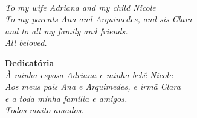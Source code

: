 \documentclass[
	12pt,				%
	openright,			%
	oneside,			%
	a4paper,			%
	sumario=tradicional,%
	french,				%
	spanish,			%
	brazil,				%
    english
	]{abntex2}
\begin{document}
\begin{dedicatoria}
   \vspace*{\fill}
   \vspace*{10cm}
   \flushright
   \noindent
   \textbf{\dedicatorianame\\}
   \textit{To my wife Adriana and my child Nicole\\
           To my parents Ana and Arquimedes, and sis Clara\\
           and to all my family and friends.\\
           All beloved.\\} \vspace*{\fill}
   
   \begin{footnotesize}
   \textbf{Dedicatória}\\
   \textit{À minha esposa Adriana e minha bebê Nicole\\
           Aos meus pais Ana e Arquimedes, e irmã Clara\\ 
           e a toda minha família e amigos.\\
           Todos muito amados.\\} \vspace*{\fill}
   \end{footnotesize}
   
\end{dedicatoria}
\end{document}
